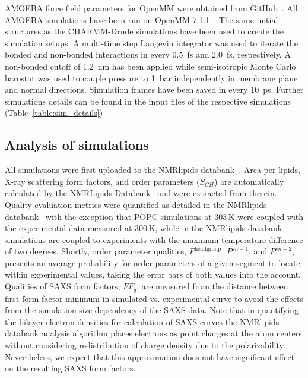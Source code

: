 \documentclass[journal=jacsat,manuscript=article,layout=singlecolumn]{achemso}
\begin{document}
AMOEBA force field parameters for OpenMM were obtained from GitHub~\cite{amoebagithub,klesse2020induced}. All AMOEBA simulations have been run on OpenMM 7.1.1~\cite{eastman2017openmm}. The same initial structures as the CHARMM-Drude simulations have been used to create the simulation setups. A multi-time step Langevin integrator was used to iterate the bonded and non-bonded interactions in every 0.5~fs and 2.0~fs, respectively. A non-bonded cutoff of 1.2~nm has been applied while semi-isotropic Monte Carlo barostat was used to couple pressure to 1~bar independently in membrane plane and normal directions.
Simulation frames have been saved in every 10~ps. Further simulations details can be found in the input files of the respective simulations (Table~\ref{table:sim_details})


\subsection{Analysis of simulations}
 All simulations were first uploaded to the NMRlipids databank~\cite{Databank}. 
Area per lipids, X-ray scattering form factors, and order parameters ($S_{CH}$) are automatically calculated by the NMRLipids Databank~\cite{Databank} and were extracted from therein. Quality evaluation metrics were quantified as detailed in the NMRlipids databank~\cite{Databank} with the exception that POPC simulations at 303\,K were coupled with the experimental data measured at 300\,K, while in the NMRlipids databank simulations are coupled to experiments with the maximum temperature difference of two degrees. Shortly, order parameter qualities, $P^{\mathrm{headgroup}}$, $P^{sn-1}$, and $P^{sn-2}$, presents an average probability for order parameters of a given segment to locate within experimental values, taking the error bars of both values into the account. Qualities of SAXS form factors, $FF_{q}$, are measured from the distance between first form factor minimum in simulated vs. experimental curve to avoid the effects from the simulation size dependency of the SAXS data.
Note that in quantifying the bilayer electron densities for calculation of SAXS curves  the NMRlipids databank analysis algorithm places electrons as point charges at the atom centers without considering redistribution of charge density due to the polarizability. Nevertheless, we expect that this approximation does not have significant effect on the resulting SAXS form factors.
\end{document}
